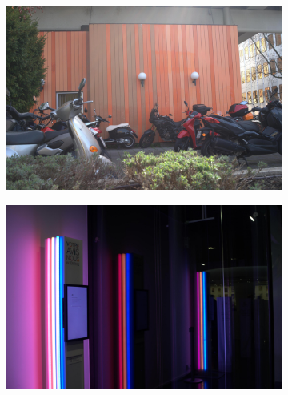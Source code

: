 \begin{figure}
\begin{subfigure}[t]{.19\textwidth}
    \end{subfigure}
    \hfill
    \begin{subfigure}[t]{.19\textwidth}
      \centering
      \includegraphics[width=\linewidth]{figures/digital4.jpeg}
    \end{subfigure}
    \begin{subfigure}[t]{.19\textwidth}
      \centering
      \includegraphics[width=\linewidth]{figures/digital5.jpeg}
    \end{subfigure}
  
    \medskip


\end{figure}
